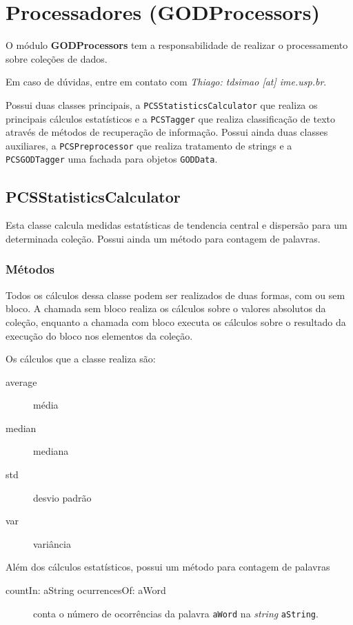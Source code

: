 

\section{Processadores (GODProcessors)}

O módulo \textbf{GODProcessors} tem a responsabilidade de realizar o processamento sobre
coleções de dados.

Em caso de dúvidas, entre em contato com \emph{Thiago: tdsimao [at] ime.usp.br}.

Possui duas classes principais, a \texttt{PCSStatisticsCalculator} que realiza os principais
cálculos estatísticos e a \texttt{PCSTagger} que realiza classificação de texto através de
métodos de recuperação de informação. Possui ainda duas classes auxiliares, a
\texttt{PCSPreprocessor} que realiza tratamento de strings e a \texttt{PCSGODTagger} uma fachada
para objetos \texttt{GODData}.

\subsection{PCSStatisticsCalculator} 

Esta classe calcula medidas estatísticas de tendencia central e dispersão para um determinada
coleção. Possui ainda um método para contagem de palavras.


\subsubsection{Métodos}
Todos os cálculos dessa classe podem ser realizados de duas formas, com ou sem bloco. A chamada
sem bloco realiza os cálculos sobre o valores absolutos da coleção, enquanto a chamada com
bloco executa os cálculos sobre o resultado da execução do bloco nos elementos da coleção.

Os cálculos que a classe realiza são:
\begin{description}
    \item[average]  média 
    \item[median] mediana
    \item[std] desvio padrão
    \item[var] variância
\end{description}

Além dos cálculos estatísticos, possui um método para contagem de palavras

\begin{description}
    \item[countIn: aString ocurrencesOf: aWord] conta o número de ocorrências da palavra
                   \texttt{aWord} na \textit{string} \texttt{aString}.
\end{description}

